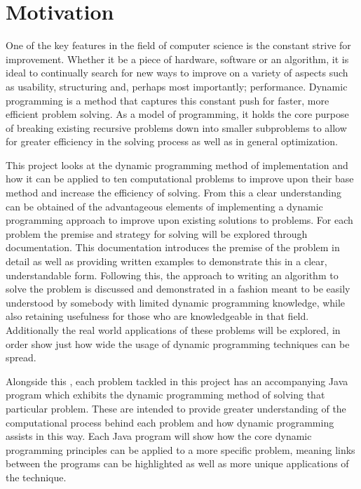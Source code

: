\section{Motivation}

One of the key features in the field of computer science is the constant strive for improvement. Whether it be a piece of hardware, software or an algorithm, it is ideal to continually search for new ways to improve on a variety of aspects such as usability, structuring and, perhaps most importantly; performance. Dynamic programming is a method that captures this constant push for faster, more efficient problem solving. As a model of programming, it holds the core purpose of breaking existing recursive problems down into smaller subproblems to allow for greater efficiency in the solving process as well as in general optimization.
\smallbreak

This project looks at the dynamic programming method of implementation and how it can be applied to ten computational problems to improve upon their base method and increase the efficiency of solving. From this a clear understanding can be obtained of the advantageous elements of implementing a dynamic programming approach to improve upon existing solutions to problems. For each problem the premise and strategy for solving will be explored through documentation. This documentation introduces the premise of the problem in detail as well as providing written examples to demonstrate this in a clear, understandable form. Following this, the approach to writing an algorithm to solve the problem is discussed and demonstrated in a fashion meant to be easily understood by somebody with limited dynamic programming knowledge, while also retaining usefulness for those who are knowledgeable in that field. Additionally the real world applications of these problems will be explored, in order show just how wide the usage of dynamic programming techniques can be spread. 
\smallbreak

Alongside this , each problem tackled in this project has an accompanying Java program which exhibits the dynamic programming method of solving that particular problem. These are intended to provide greater understanding of the computational process behind each problem and how dynamic programming assists in this way. Each Java program will show how the core dynamic programming principles can be applied to a more specific problem, meaning links between the programs can be highlighted as well as more unique applications of the technique.\\



